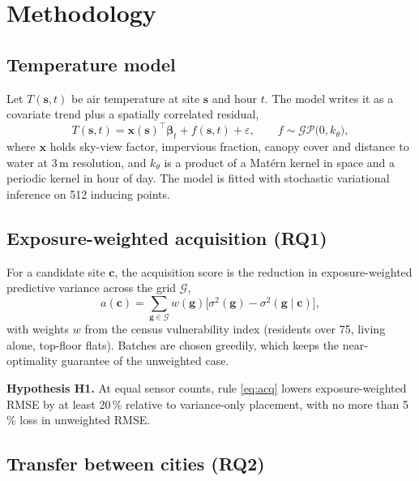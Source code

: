 \chapter{Methodology}\label{ch:methods}

\section{Temperature model}

Let $T(\mathbf{s},t)$ be air temperature at site $\mathbf{s}$ and hour
$t$. The model writes it as a covariate trend plus a spatially
correlated residual,
\begin{equation}
  T(\mathbf{s},t) = \mathbf{x}(\mathbf{s})^{\top}\boldsymbol{\beta}_t
  + f(\mathbf{s},t) + \varepsilon,
  \qquad f \sim \mathcal{GP}\bigl(0, k_{\theta}\bigr),
  \label{eq:model}
\end{equation}
where $\mathbf{x}$ holds sky-view factor, impervious fraction, canopy
cover and distance to water at 3\,m resolution, and $k_\theta$ is a
product of a Matérn kernel in space and a periodic kernel in hour of
day. The model is fitted with stochastic variational inference on 512
inducing points.

\section{Exposure-weighted acquisition (RQ1)}

For a candidate site $\mathbf{c}$, the acquisition score is the
reduction in exposure-weighted predictive variance across the grid
$\mathcal{G}$,
\begin{equation}
  a(\mathbf{c}) = \sum_{\mathbf{g}\in\mathcal{G}} w(\mathbf{g})
  \bigl[\sigma^2(\mathbf{g}) - \sigma^2(\mathbf{g}\mid\mathbf{c})\bigr],
  \label{eq:acq}
\end{equation}
with weights $w$ from the census vulnerability index (residents over
75, living alone, top-floor flats). Batches are chosen greedily, which
keeps the near-optimality guarantee of the unweighted case.

\textbf{Hypothesis H1.} At equal sensor counts, rule \eqref{eq:acq}
lowers exposure-weighted RMSE by at least 20\,\% relative to
variance-only placement, with no more than 5\,\% loss in unweighted RMSE.

\section{Transfer between cities (RQ2)}

